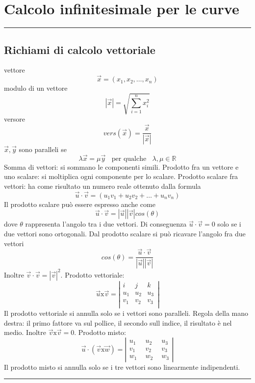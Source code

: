 \section{Calcolo infinitesimale per le curve}
\rule{\textwidth}{2pt}
\subsection{Richiami di calcolo vettoriale}
vettore
\[
    \vec{x} = (x_1, x_2, \dots, x_n)
\]
modulo di un vettore
\[
    |\vec{x}| = \sqrt{\sum_{i=1}^{n}x_i^2}
\]
versore
\[
    vers(\vec{x}) = \frac{\vec{x}}{|\vec{x}|}
\]
$\vec{x}, \vec{y}$ sono paralleli se
\[
    \lambda \vec{x} = \mu \vec{y}\;\; \text{ per qualche } \;\;\lambda, \mu \in \mathbb{R}
\]
Somma di vettori: si sommano le componenti simili.\newline
Prodotto fra un vettore e uno scalare: si moltiplica ogni componente per lo scalare.\newline
Prodotto scalare fra vettori: ha come risultato un numero reale ottenuto dalla formula
\[
    \vec{u} \cdot \vec{v} = (u_1 v_1 + u_2 v_2 + \dots + u_n v_n)
\]
Il prodotto scalare può essere espresso anche come
\[
    \vec{u} \cdot \vec{v} = |\vec{u}| |\vec{v}| cos(\theta)
\]
dove $\theta$ rappresenta l'angolo tra i due vettori. Di conseguenza $\vec{u} \cdot  \vec{v} = 0$ solo se i due vettori sono ortogonali.\newline
Dal prodotto scalare si può ricavare l'angolo fra due vettori
\[
    cos(\theta) = \frac{\vec{u} \cdot  \vec{v} }{|\vec{u}| |\vec{v}|}
\]
Inoltre $\vec{v} \cdot  \vec{v} = |\vec{v}|^2$.\newline
Prodotto vettoriale:
\[
    \vec{u}\text{x}\vec{v} = \left|\begin{matrix}
        i \;\; & j \;\;& k \;\;\\
        u_1 & u_2 & u_3\\
        v_1 & v_2 & v_3\\
    \end{matrix}\right|
\]
Il prodotto vettoriale si annulla solo se i vettori sono paralleli.\newline
Regola della mano destra: il primo fattore va sul pollice, il secondo sull indice, il risultato è nel medio.\newline
Inoltre $\vec{v} \text{x} \vec{v} = 0$.\newline
Prodotto misto:
\[
    \vec{u} \cdot (\vec{v} \text{x} \vec{w}) = \left|\begin{matrix}
        u_1 \;\;& u_2 \;\;& u_3\\
        v_1 &v_2 & v_3\\
        w_1 &w_2 & w_3
    \end{matrix}\right|
\]
Il prodotto misto si annulla solo se i tre vettori sono linearmente indipendenti.\newline
\rule{\textwidth}{2pt}
